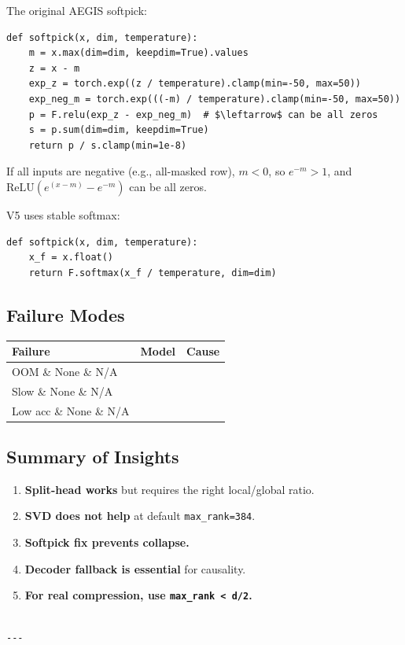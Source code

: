 The original AEGIS softpick:

\begin{lstlisting}
def softpick(x, dim, temperature):
    m = x.max(dim=dim, keepdim=True).values
    z = x - m
    exp_z = torch.exp((z / temperature).clamp(min=-50, max=50))
    exp_neg_m = torch.exp(((-m) / temperature).clamp(min=-50, max=50))
    p = F.relu(exp_z - exp_neg_m)  # $\leftarrow$ can be all zeros
    s = p.sum(dim=dim, keepdim=True)
    return p / s.clamp(min=1e-8)
\end{lstlisting}

If all inputs are negative (e.g., all-masked row), $m < 0$, so 
$e^{-m} > 1$, and $\text{ReLU}(e^{(x-m)} - e^{-m})$ can be all zeros.

V5 uses stable softmax:

\begin{lstlisting}
def softpick(x, dim, temperature):
    x_f = x.float()
    return F.softmax(x_f / temperature, dim=dim)
\end{lstlisting}

\subsection{Failure Modes}

\begin{table}[H]
\centering
\small
\begin{tabular}{lll}
\toprule
\textbf{Failure} & \textbf{Model} & \textbf{Cause} \\
\midrule
OOM \& None \& N/A \\
Slow \& None \& N/A \\
Low acc \& None \& N/A \\
\bottomrule
\end{tabular}
\end{table}

\subsection{Summary of Insights}

\begin{enumerate}
\item \textbf{Split-head works} but requires the right local/global ratio.
\item \textbf{SVD does not help} at default \texttt{max\_rank=384}.
\item \textbf{Softpick fix prevents collapse.}
\item \textbf{Decoder fallback is essential} for causality.
\item \textbf{For real compression, use \texttt{max\_rank < d/2}.}
\end{enumerate}
\begin{lstlisting}

---
\end{lstlisting}

